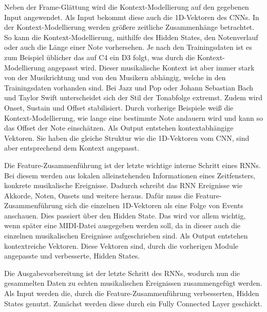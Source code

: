 Neben der Frame-Glättung wird die Kontext-Modellierung auf den gegebenen Input angewendet.
Als Input bekommt diese auch die 1D-Vektoren des CNNs.
In der Kontext-Modellierung werden größere zeitliche Zusammenhänge betrachtet.
So kann die Kontext-Modellierung, mithilfe des Hidden States,
den Notenverlauf oder auch die Länge einer Note vorhersehen.
Je nach den Trainingsdaten ist es zum Beispiel üblicher das auf C4 ein D3 folgt,
was durch die Kontext-Modellierung angepasst wird.
Dieser musikalische Kontext ist aber immer stark von der Musikrichtung und von den Musikern abhängig,
welche in den Trainingsdaten vorhanden sind.
Bei Jazz und Pop oder Johann Sebastian Bach und Taylor Swift unterscheidet sich der Stil der Tonabfolge extremst.
Zudem wird Onset, Sustain und Offset stabilisiert.
Durch vorherige Beispiele weiß die Kontext-Modellierung,
wie lange eine bestimmte Note andauern wird und kann so das Offset der Note einschätzen.
Als Output entstehen kontextabhängige Vektoren.
Sie haben die gleiche Struktur wie die 1D-Vektoren vom CNN, sind aber entsprechend dem Kontext angepasst.

Die Feature-Zusammenführung ist der letzte wichtige interne Schritt eines RNNs.
Bei diesem werden aus lokalen alleinstehenden Informationen eines Zeitfensters, konkrete musikalische Ereignisse.
Dadurch schreibt das RNN Ereignisse wie Akkorde, Noten, Onsets und weitere heraus.
Dafür muss die Feature-Zusammenführung sich die einzelnen 1D-Vektoren als eine Folge von Events anschauen.
Dies passiert über den Hidden State.
Das wird vor allem wichtig, wenn später eine MIDI-Datei ausgegeben werden soll,
da in dieser auch die einzelnen musikalischen Ereignisse aufgeschrieben sind.
Als Output entstehen kontextreiche Vektoren.
Diese Vektoren sind, durch die vorherigen Module angepasste und verbesserte, Hidden States.

Die Ausgabevorbereitung ist der letzte Schritt des RNNs,
wodurch nun die gesammelten Daten zu echten musikalischen Ereignissen zusammengefügt werden.
Als Input werden die, durch die Feature-Zusammenführung verbesserten, Hidden States genutzt.
Zunächst werden diese durch ein Fully Connected Layer geschickt.

